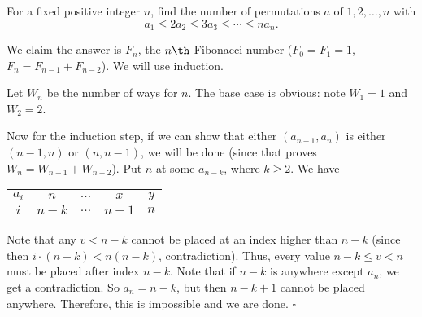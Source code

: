 
\begin{problem}[ISL 2020 C1]
    For a fixed positive integer $n$, find the number of permutations $a$ of $1, 2, \ldots, n$ with \[a_1 \leq 2a_2 \leq 3a_3 \leq \cdots \leq na_n.\]
\end{problem}

\begin{solution}
    We claim the answer is $F_n$, the $n\th$ Fibonacci number ($F_0 = F_1 = 1$, $F_n = F_{n-1} + F_{n-2}$). We will use induction.
    
    Let $W_n$ be the number of ways for $n$. The base case is obvious: note $W_1 = 1$ and $W_2 = 2$.
    
    Now for the induction step, if we can show that either $(a_{n-1}, a_n)$ is either $(n-1, n)$ or $(n, n-1)$, we will be done (since that proves $W_n = W_{n-1} + W_{n-2}$). Put $n$ at some $a_{n-k}$, where $k \geq 2$. We have \begin{center} \begin{tabular}{c|c c c c}
        $a_i$ & $n$   & $\ldots$ & $x$   & $y$\\
        $i$   & $n-k$ & $\ldots$ & $n-1$ & $n$
    \end{tabular} \end{center}
    Note that any $v < n-k$ cannot be placed at an index higher than $n-k$ (since then $i \cdot (n-k) < n(n-k)$, contradiction). Thus, every value $n-k \leq v < n$ must be placed after index $n-k$. Note that if $n-k$ is anywhere except $a_n$, we get a contradiction. So $a_n = n-k$, but then $n-k+1$ cannot be placed anywhere. Therefore, this is impossible and we are done. $\square$
\end{solution}
